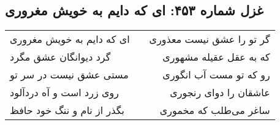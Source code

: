 \begin{center}
\section*{غزل شماره ۴۵۳: ای که دایم به خویش مغروری}
\label{sec:sh453}
\begin{longtable}{l p{0.5cm} r}
ای که دایم به خویش مغروری
&&
گر تو را عشق نیست معذوری
\\
گرد دیوانگان عشق مگرد
&&
که به عقل عقیله مشهوری
\\
مستی عشق نیست در سر تو
&&
رو که تو مست آب انگوری
\\
روی زرد است و آه دردآلود
&&
عاشقان را دوای رنجوری
\\
بگذر از نام و ننگ خود حافظ
&&
ساغر می‌طلب که مخموری
\\
\end{longtable}
\end{center}
